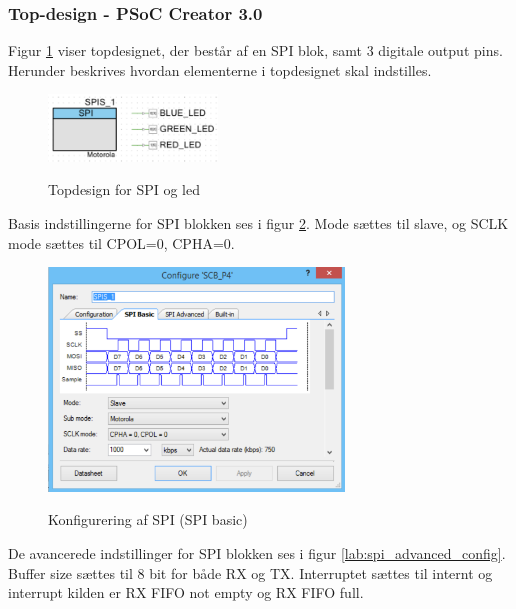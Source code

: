 
\subsubsection*{Top-design - PSoC Creator 3.0}

Figur \ref{lab:topdesign_spi} viser topdesignet, der består af en SPI blok, samt 3 digitale output pins. Herunder beskrives hvordan elementerne i topdesignet skal indstilles.

\begin{figure}[H] \centering
{\includegraphics[width=0.4\textwidth]{filer/implementering/spi/spi_handler_topdesign}}
\caption{Topdesign for SPI og led}
\label{lab:topdesign_spi}
\raggedright
\end{figure}

Basis indstillingerne for SPI blokken ses i figur \ref{lab:spi_basic_config}. Mode sættes til slave, og SCLK mode sættes til CPOL=0, CPHA=0.

\begin{figure}[H] \centering
{\includegraphics[width=0.7\textwidth]{filer/implementering/spi/spi_handler_topdesign_spi_basic}}
\caption{Konfigurering af SPI (SPI basic)}
\label{lab:spi_basic_config}
\raggedright
\end{figure}

De avancerede indstillinger for SPI blokken ses i figur \ref{lab:spi_advanced_config}. Buffer size sættes til 8 bit for både RX og TX. Interruptet sættes til internt og interrupt kilden er RX FIFO not empty og RX FIFO full.

